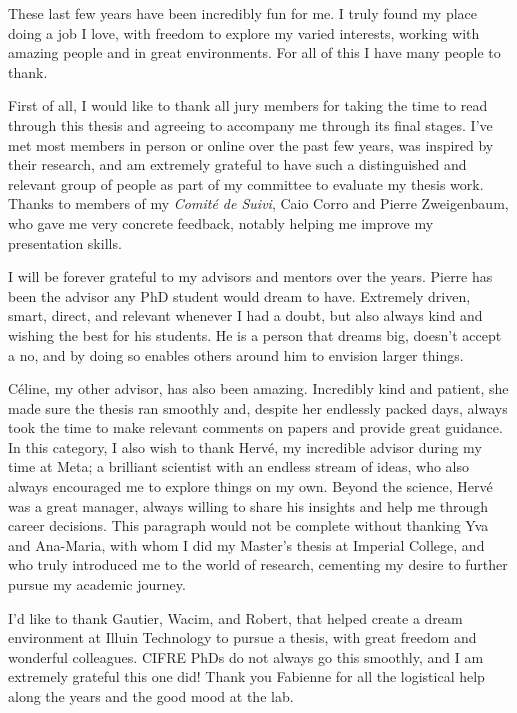 These last few years have been incredibly fun for me. I truly found my place doing a job I love, with freedom to explore my varied interests, working with amazing people and in great environments. For all of this I have many people to thank.

First of all, I would like to thank all jury members for taking the time to read through this thesis and agreeing to accompany me through its final stages. I've met most members in person or online over the past few years, was inspired by their research, and am extremely grateful to have such a distinguished and relevant group of people as part of my committee to evaluate my thesis work.
Thanks to members of my \emph{Comité de Suivi}, Caio Corro and Pierre Zweigenbaum, who gave me very concrete feedback, notably helping me improve my presentation skills.

I will be forever grateful to my advisors and mentors over the years. Pierre has been the advisor any PhD student would dream to have. Extremely driven, smart, direct, and relevant whenever I had a doubt, but also always kind and wishing the best for his students. He is a person that dreams big, doesn't accept a no, and by doing so enables others around him to envision larger things.

Céline, my other advisor, has also been amazing. Incredibly kind and patient, she made sure the thesis ran smoothly and, despite her endlessly packed days, always took the time to make relevant comments on papers and provide great guidance. In this category, I also wish to thank Hervé, my incredible advisor during my time at Meta; a brilliant scientist with an endless stream of ideas, who also always encouraged me to explore things on my own. Beyond the science, Hervé was a great manager, always willing to share his insights and help me through career decisions.
This paragraph would not be complete without thanking Yva and Ana-Maria, with whom I did my Master's thesis at Imperial College, and who truly introduced me to the world of research, cementing my desire to further pursue my academic journey.

I'd like to thank Gautier, Wacim, and Robert, that helped create a dream environment at Illuin Technology to pursue a thesis, with great freedom and wonderful colleagues. CIFRE PhDs do not always go this smoothly, and I am extremely grateful this one did! Thank you Fabienne for all the logistical help along the years and the good mood at the lab.

